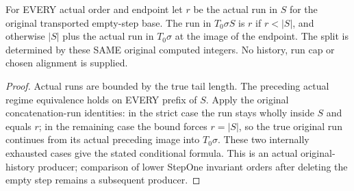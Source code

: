 \begin{theorem}
\label{hir:original-positive-companion-middle-empty-run-cap}
\leanok
For EVERY actual order and endpoint let $r$ be the actual run in $S$ for the original transported empty-step base. The run in $T_0\sigma S$ is $r$ if $r<|S|$, and otherwise $|S|$ plus the actual run in $T_0\sigma$ at the image of the endpoint. The split is determined by these SAME original computed integers. No history, run cap or chosen alignment is supplied.
\end{theorem}
\begin{proof}
Actual runs are bounded by the true tail length. The preceding actual regime equivalence holds on EVERY prefix of $S$. Apply the original concatenation-run identities: in the strict case the run stays wholly inside $S$ and equals $r$; in the remaining case the bound forces $r=|S|$, so the true original run continues from its actual preceding image into $T_0\sigma$. These two internally exhausted cases give the stated conditional formula. This is an actual original-history producer; comparison of lower StepOne invariant orders after deleting the empty step remains a subsequent producer.
\end{proof}
